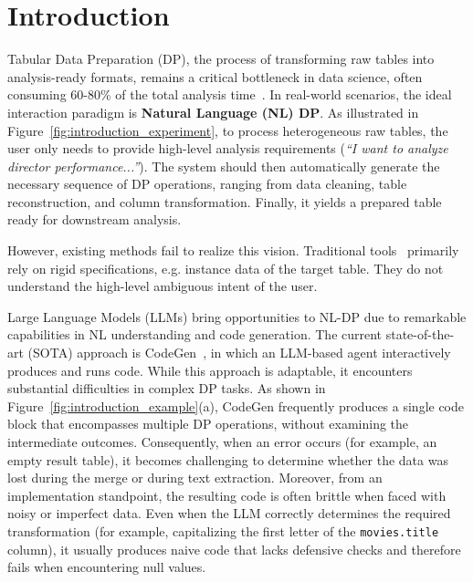 \section{Introduction}
\label{sec:intro}

% 



Tabular Data Preparation (DP), the process of transforming raw tables into analysis-ready formats, remains a critical bottleneck in data science, often consuming 60-80\% of the total analysis time~\cite{dasu2003exploratory}. 
In real-world scenarios, the ideal interaction paradigm is \textbf{Natural Language (NL) \nlwhat DP}. As illustrated in Figure~\ref{fig:introduction_experiment},
to process heterogeneous raw tables, the user only needs to provide  high-level analysis requirements (\eg \textit{``I want to analyze director performance...''}). The system should then automatically generate the necessary sequence of DP operations, ranging from data cleaning, table reconstruction, and column transformation. Finally, it yields a prepared table ready for downstream analysis. 

However, existing methods fail to realize this vision. Traditional tools~\cite{barowy2015flashrelate, singh2016blinkfill, he2018transform, gulwani2012spreadsheet, jin2017foofah, heer2015predictive} primarily rely on rigid specifications, e.g. instance data of the target table. They do not understand the high-level ambiguous intent of the user. 

Large Language Models (LLMs) bring opportunities to NL-\nlwhat DP due to remarkable capabilities in NL understanding and code generation. 
The current state-of-the-art (SOTA) approach is CodeGen~\cite{sapkota2025vibe}, in which an LLM-based agent interactively produces and runs code.
While this approach is adaptable, it encounters substantial difficulties in complex DP tasks. As shown in Figure~\ref{fig:introduction_example}(a), CodeGen frequently produces a single code block that encompasses multiple DP operations, without examining the intermediate outcomes. Consequently, when an error occurs (for example, an empty result table), it becomes challenging to determine whether the data was lost during the merge or during text extraction.
Moreover, from an implementation standpoint, the resulting code is often brittle when faced with noisy or imperfect data. Even when the LLM correctly determines the required transformation (for example, capitalizing the first letter of the \texttt{movies.title} column), it usually produces naive code that lacks defensive checks and therefore fails when encountering null values.

